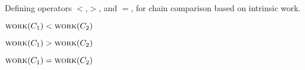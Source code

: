 \begin{algorithm}
  \caption{\label{alg:operators}
    Defining operators
    $<$,$>$, and $=$, for chain comparison
    based on intrinsic work.}
  \begin{algorithmic}[1]

    \State \Return $\textsc{work}(C_1) < \textsc{work}(C_2)$
  \EndFunction

    \State \Return $\textsc{work}(C_1) > \textsc{work}(C_2)$
  \EndFunction

    \State \Return $\textsc{work}(C_1) = \textsc{work}(C_2)$
  \EndFunction

  \end{algorithmic}
\end{algorithm}
